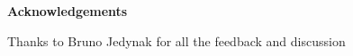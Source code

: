 
\thispagestyle{plain}
\begin{center}
    \textbf{Acknowledgements}
    
    Thanks to Bruno Jedynak for all the feedback and discussion
\end{center}

